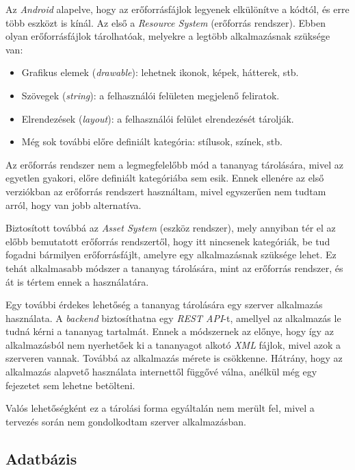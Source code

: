 \documentclass[12pt,a4paper]{article}
\newcommand{\xml}{\textit{XML}\xspace}
\begin{document}
	Az \textit{Android} alapelve, hogy az erőforrásfájlok legyenek elkülönítve a kódtól, és erre több eszközt is kínál. Az első a \textit{Resource System} (erőforrás rendszer). Ebben olyan erőforrásfájlok tárolhatóak, melyekre a legtöbb alkalmazásnak szüksége van:
	
	\begin{itemize}
		\item Grafikus elemek (\textit{drawable}): lehetnek ikonok, képek, hátterek, stb.
		\item Szövegek (\textit{string}): a felhasználói felületen megjelenő feliratok.
		\item Elrendezések (\textit{layout}): a felhasználói felület elrendezését tárolják.
		\item Még sok további előre definiált kategória: stílusok, színek, stb.
	\end{itemize} 

	Az erőforrás rendszer nem a legmegfelelőbb mód a tananyag tárolására, mivel az egyetlen gyakori, előre definiált kategóriába sem esik. Ennek ellenére az első verziókban az erőforrás rendszert használtam, mivel egyszerűen nem tudtam arról, hogy van jobb alternatíva.
	
	Biztosított továbbá az \textit{Asset System} (eszköz rendszer), mely annyiban tér el az előbb bemutatott erőforrás rendszertől, hogy itt nincsenek kategóriák, be tud fogadni bármilyen erőforrásfájlt, amelyre egy alkalmazásnak szüksége lehet. Ez tehát alkalmasabb módszer a tananyag tárolására, mint az erőforrás rendszer, és át is tértem ennek a használatára.
	
	Egy további érdekes lehetőség a tananyag tárolására egy szerver alkalmazás használata. A \textit{backend} biztosíthatna egy \textit{REST API}-t, amellyel az alkalmazás le tudná kérni a tananyag tartalmát. Ennek a módszernek az előnye, hogy így az alkalmazásból nem nyerhetőek ki a tananyagot alkotó \xml fájlok, mivel azok a szerveren vannak. Továbbá az alkalmazás mérete is csökkenne. Hátrány, hogy az alkalmazás alapvető használata internettől függővé válna, anélkül még egy fejezetet sem lehetne betölteni. 
	
	Valós lehetőségként ez a tárolási forma egyáltalán nem merült fel, mivel a tervezés során nem gondolkodtam szerver alkalmazásban.
	
	\subsection{Adatbázis}
	
\end{document}
